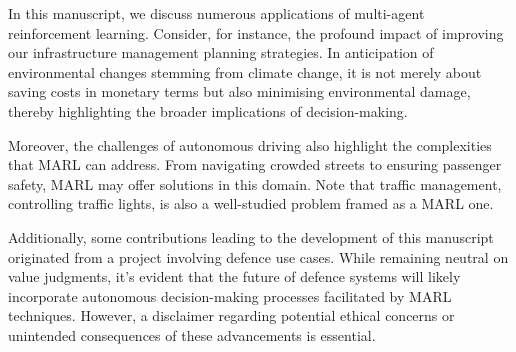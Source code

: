 In this manuscript, we discuss numerous applications of multi-agent reinforcement learning. 
Consider, for instance, the profound impact of improving our infrastructure management planning strategies.
In anticipation of environmental changes stemming from climate change, it is not merely about saving costs in monetary terms but also minimising environmental damage, thereby highlighting the broader implications of decision-making.

Moreover, the challenges of autonomous driving also highlight the complexities that MARL can address.
From navigating crowded streets to ensuring passenger safety, MARL may offer solutions in this domain.
Note that traffic management, controlling traffic lights, is also a well-studied problem framed as a MARL one.

Additionally, some contributions leading to the development of this manuscript originated from a project involving defence use cases.
While remaining neutral on value judgments, it's evident that the future of defence systems will likely incorporate autonomous decision-making processes facilitated by MARL techniques.
However, a disclaimer regarding potential ethical concerns or unintended consequences of these advancements is essential.

